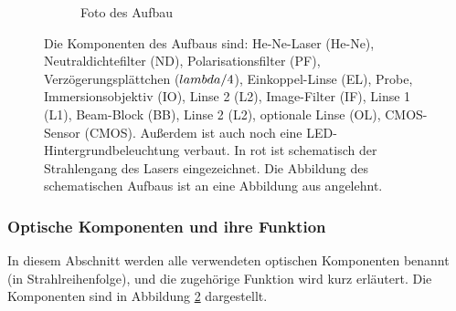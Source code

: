 \documentclass[titlepage,  ngerman]{article}
\begin{document}
\begin{figure}
\begin{subfigure}[b]{0.9\textwidth}
			\caption{Foto des Aufbau}
			\label{fig:aufsicht_aufbau_anotated}
		\end{subfigure}
		\caption[Versuchsaufbau]{Die Komponenten des Aufbaus sind: He-Ne-Laser (He-Ne), Neutraldichtefilter (ND), Polarisationsfilter (PF), Verzögerungsplättchen ($\\lambda/4$), Einkoppel-Linse (EL), Probe, Immersionsobjektiv (IO), Linse 2 (L2), Image-Filter (IF), Linse 1 (L1), Beam-Block (BB), Linse 2 (L2), optionale Linse (OL), CMOS-Sensor (CMOS). Außerdem ist auch noch eine LED-Hintergrundbeleuchtung verbaut. In rot ist schematisch der Strahlengang des Lasers eingezeichnet. Die Abbildung des schematischen Aufbaus ist an eine Abbildung aus \cite{Jaruschewski.2020} angelehnt.}
		\label{fig:Aufbau}
	\end{figure}
	\subsubsection{Optische Komponenten und ihre Funktion}
		In diesem Abschnitt werden alle verwendeten optischen Komponenten benannt (in Strahlreihenfolge), und die zugehörige Funktion wird kurz erläutert. Die Komponenten sind in Abbildung \ref{fig:Aufbau} dargestellt.
\end{document}
